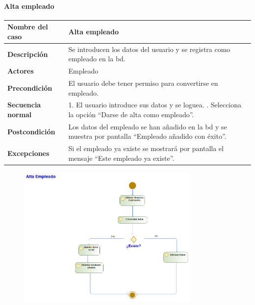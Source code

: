 \paragraph{Alta empleado}
\begin{table}[H]
	\centering
	\small
	\begin{tabularx}{0.8\textwidth}{|p{3.5cm}|X|}
		\hline
		\rowcolor{lightgray}
		\textbf{Nombre del caso}  & \textbf{Alta empleado}                                                                                         \\
		\hline
		\textbf{Descripción}      & Se introducen los datos del usuario y se registra como empleado en la \gls{bd}.                                \\
		\hline
		\textbf{Actores}          & Empleado                                                                                                       \\
		\hline
		\textbf{Precondición}     & El usuario debe tener permiso para convertirse en empleado.                                                    \\
		\hline
		\textbf{Secuencia normal} & 1. El usuario introduce sus datos y se loguea. \newline
		2. Selecciona la opción ``Darse de alta como empleado''.                                                                                   \\
		\hline
		\textbf{Postcondición}    & Los datos del empleado se han añadido en la \gls{bd} y se muestra por pantalla ``Empleado añadido con éxito''. \\
		\hline
		\textbf{Excepciones}      & Si el empleado ya existe se mostrará por pantalla el mensaje ``Este empleado ya existe''.                      \\
		\hline
	\end{tabularx}
\end{table}
\begin{figure}[H]
	\centering
	\includegraphics[width=0.8\textwidth]{Use_Cases/Alta_empleado.png}
\end{figure}
\newpage
